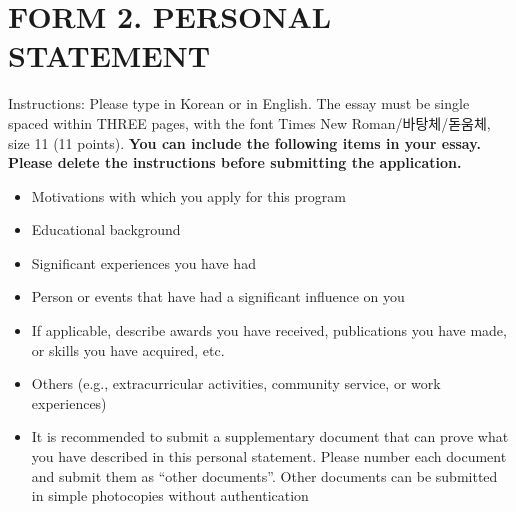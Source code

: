 \documentclass[../main.tex]{subfiles}
\begin{document}
\section{FORM 2. PERSONAL STATEMENT}%
\label{sec:FORM 2. PERSONAL STATEMENT}

\begin{elaboration}
	Instructions: Please type in Korean or in English. The essay must be single spaced within THREE pages, with the font Times New Roman/바탕체/돋움체, size 11 (11 points). \textbf{You can include the following items in your essay. Please delete the instructions before submitting the application.}

	\begin{itemize}
		\item[\scriptsize{\ding{110}}] Motivations with which you apply for this program
		\item[\scriptsize{\ding{110}}] Educational background
		\item[\scriptsize{\ding{110}}] Significant experiences you have had
		\item[\scriptsize{\ding{110}}] Person or events that have had a significant influence on you
		\item[\scriptsize{\ding{110}}] If applicable, describe awards you have received, publications you have made, or skills you have acquired, etc.
		\item[\scriptsize{\ding{110}}] Others (e.g., extracurricular activities, community service, or work experiences)
	\end{itemize}

	\begin{itemize}

		\renewcommand{\labelitemi}{\hfill※ }
		\item It is recommended to submit a supplementary document that can prove what you have described in this personal statement. Please number each document and submit them as “other documents”. Other documents can be submitted in simple photocopies without authentication
	\end{itemize}

\end{elaboration}
\end{document}
